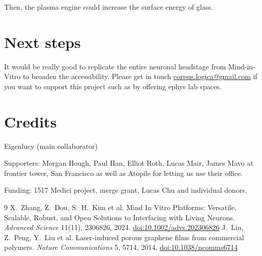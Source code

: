 \documentclass[11pt,letterpaper]{article}
\begin{document}
Then, the plasma engine could increase the surface energy of glass.

\section{Next steps}

It would be really good to replicate the entire neuronal headstage from Mind-in-Vitro
to broaden the accessibility. Please get in touch
\href{mailto:corpus.logica@gmail.com}{corpus.logica@gmail.com} if you want to support
this project such as by offering ephys lab spaces.

\section*{Credits}

Eigenlucy (main collaborator)

Supporters: Morgan Hough, Paul Han, Elliot Roth, Lucas Mair, James Mavo at frontier
tower, San Francisco as well as Atopile for letting us use their office.

Funding: 1517 Medici project, merge grant, Lucas Chu and individual donors.

\begin{thebibliography}{9}
\small
{} X.~Zhang, Z.~Dou, S.~H.~Kim et al.
  \newblock Mind In Vitro Platforms: Versatile, Scalable, Robust, and Open Solutions to
  Interfacing with Living Neurons.
  \newblock \emph{Advanced Science} 11(11), 2306826, 2024.
  \newblock \href{https://doi.org/10.1002/advs.202306826}{doi:10.1002/advs.202306826}
 J.~Lin, Z.~Peng, Y.~Liu et al.
  \newblock Laser-induced porous graphene films from commercial polymers.
  \newblock \emph{Nature Communications} 5, 5714, 2014.
  \newblock \href{https://doi.org/10.1038/ncomms6714}{doi:10.1038/ncomms6714}
\end{thebibliography}
\end{document}

